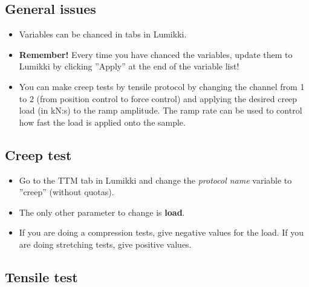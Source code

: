\documentclass[a4paper]{article}
\begin{document}
\subsection{General issues}

\begin{itemize}
  \item Variables can be chanced in tabs in Lumikki.
  \item \textbf{Remember!} Every time you have chanced the variables, update them to Lumikki by clicking ''Apply'' at the end of the variable list!
  \item You can make creep tests by tensile protocol by changing the channel from 1 to 2 (from position control to force control) and applying the desired creep load (in kN:s) to the ramp amplitude. The ramp rate can be used to control how fast the load is applied onto the sample.
\end{itemize}

\subsection{Creep test}

\begin{itemize}
  \item Go to the TTM tab in Lumikki and change the \textit{protocol name} variable to ''creep'' (without quotas).
  \item The only other parameter to change is \textbf{load}.
  \item If you are doing a compression tests, give negative values for the load. If you are doing stretching tests, give positive values.
\end{itemize}

\subsection{Tensile test}
\end{document}
